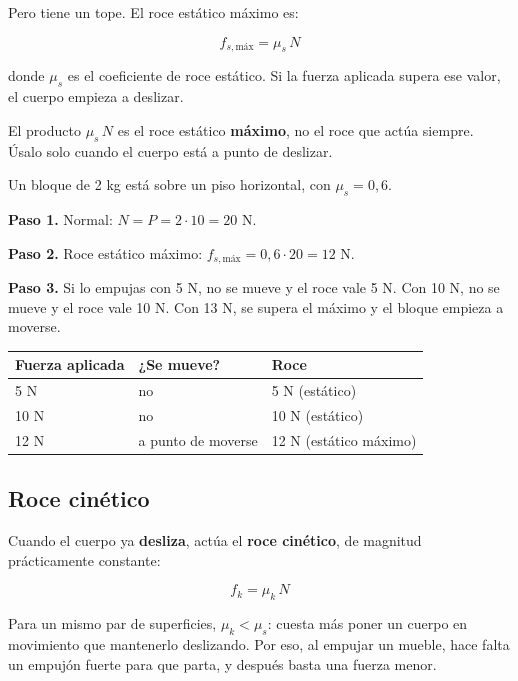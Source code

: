  

Pero tiene un tope. El roce estático máximo es:

 \[ f_{s,\text{máx}} = \mu_s\,N \] 

donde $\mu_s$ es el coeficiente de roce estático. Si la fuerza aplicada supera ese valor, el cuerpo empieza a deslizar.

 
\begin{clave}[{Recuerda}] El producto $\mu_s\,N$ es el roce estático \textbf{máximo}, no el roce que actúa siempre. Úsalo solo cuando el cuerpo está a punto de deslizar.\end{clave}
  
\begin{ejemplo} Un bloque de 2 kg está sobre un piso horizontal, con $\mu_s = 0{,}6$.\par \textbf{Paso 1.} Normal: $N = P = 2\cdot 10 = 20$ N.\par \textbf{Paso 2.} Roce estático máximo: $f_{s,\text{máx}} = 0{,}6\cdot 20 = 12$ N.\par \textbf{Paso 3.} Si lo empujas con 5 N, no se mueve y el roce vale 5 N. Con 10 N, no se mueve y el roce vale 10 N. Con 13 N, se supera el máximo y el bloque empieza a moverse.\end{ejemplo}
 
\begin{center}\small
\begin{tabular}{@{}lll@{}}
\toprule
\textbf{Fuerza aplicada} & \textbf{¿Se mueve?} & \textbf{Roce} \\
\midrule
5 N & no & 5 N (estático) \\
10 N & no & 10 N (estático) \\
12 N & a punto de moverse & 12 N (estático máximo) \\
\bottomrule
\end{tabular}
\end{center}
\subsection{Roce cinético}
Cuando el cuerpo ya \textbf{desliza}, actúa el \textbf{roce cinético}, de magnitud prácticamente constante:

 \[ f_k = \mu_k\,N \] 

Para un mismo par de superficies, $\mu_k < \mu_s$: cuesta más poner un cuerpo en movimiento que mantenerlo deslizando. Por eso, al empujar un mueble, hace falta un empujón fuerte para que parta, y después basta una fuerza menor.

